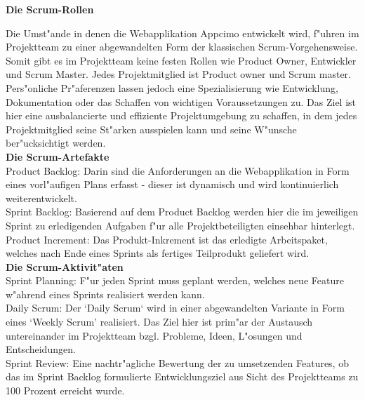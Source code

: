 \documentclass[a4paper, 11pt]{scrreprt}
\begin{document}
\textbf{Die Scrum-Rollen} 

Die Umst"ande in denen die Webapplikation Appcimo entwickelt wird, f"uhren im Projektteam zu einer abgewandelten Form der klassischen Scrum-Vorgehensweise. \\

Somit gibt es im Projektteam keine festen Rollen wie Product Owner, Entwickler und Scrum Master. Jedes Projektmitglied ist Product owner und Scrum master. Pers"onliche Pr"aferenzen lassen jedoch eine Spezialisierung wie Entwicklung, Dokumentation oder das Schaffen von wichtigen Voraussetzungen zu. Das Ziel ist hier eine ausbalancierte und effiziente Projektumgebung zu schaffen, in dem jedes Projektmitglied seine St"arken ausspielen kann und seine W"unsche ber"ucksichtigt werden. \\


\textbf{Die Scrum-Artefakte} \\

Product Backlog: Darin sind die Anforderungen an die Webapplikation in Form eines vorl"aufigen Plans erfasst - dieser ist dynamisch und wird kontinuierlich weiterentwickelt. \\

Sprint Backlog: Basierend auf dem Product Backlog werden hier die im jeweiligen Sprint zu erledigenden Aufgaben f"ur alle Projektbeteiligten einsehbar hinterlegt.\\

Product Increment: Das Produkt-Inkrement ist das erledigte Arbeitspaket, welches nach Ende eines Sprints als fertiges Teilprodukt geliefert wird.\\



\textbf{Die Scrum-Aktivit"aten}\\

Sprint Planning: F"ur jeden Sprint muss geplant werden, welches neue Feature w"ahrend eines Sprints realisiert werden kann.\\

Daily Scrum: Der ‘Daily Scrum‘ wird in einer abgewandelten Variante in Form eines ‘Weekly Scrum’ realisiert. Das Ziel hier ist prim"ar der Austausch untereinander im Projektteam bzgl. Probleme, Ideen, L"osungen und Entscheidungen.\\

Sprint Review: Eine nachtr"agliche Bewertung der zu umsetzenden Features, ob  das im Sprint Backlog formulierte Entwicklungsziel aus Sicht des Projektteams zu 100 Prozent erreicht wurde.\\
\end{document}
